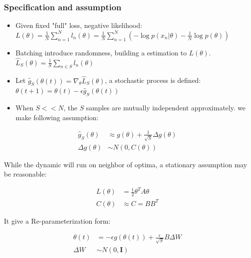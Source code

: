 \documentclass{beamer}
\begin{document}
\begin{frame}
    \frametitle{Specification and assumption}
    \begin{itemize}
        \item Given fixed "full" loss, negative likelihood: $L(\theta) = \frac{1}{N}\sum_{n=1}^N l_n(\theta) = \frac{1}{N} \sum_{n=1}^N (-\log p(x_n|\theta) - \frac{1}{N} \log p(\theta))$
        \item Batching introduce randomness, building a estimation to $L(\theta)$. $\hat{L}_S(\theta) = \frac{1}{S} \sum_{n\in S} l_n(\theta)$
        \item Let $\hat{g}_S(\theta (t)) = \nabla_\theta \hat{L}_S(\theta)$, a stochastic process is defined: $\theta(t+1) = \theta(t) - \epsilon \hat{g}_S(\theta(t))$
        \item When $S << N$, the $S$ samples are mutually independent approximately. we make following assumption:

    \end{itemize}
    \begin{align*}
    \hat{g}_S(\theta) &\approx g(\theta) + \frac{1}{\sqrt{S}} \Delta g(\theta) \\
    \Delta g(\theta) &\sim N(0,C(\theta))
    \end{align*}

\end{frame}

\begin{frame}
    While the dynamic will run on neighbor of optima, a stationary assumption may be reasonable:

    \begin{align*}
    L(\theta) &= \frac{1}{2} \theta^T A \theta \\
    C(\theta) &\approx C = BB^T
    \end{align*}

    It give a Re-parameterization form:
    
    \begin{align*}
    \theta(t) &= -\epsilon g(\theta(t)) + \frac{\epsilon}{\sqrt{S}} B \Delta W \\
    \Delta W &\sim N(0,\mathbf{I})
    \end{align*}

\end{frame}
\end{document}
